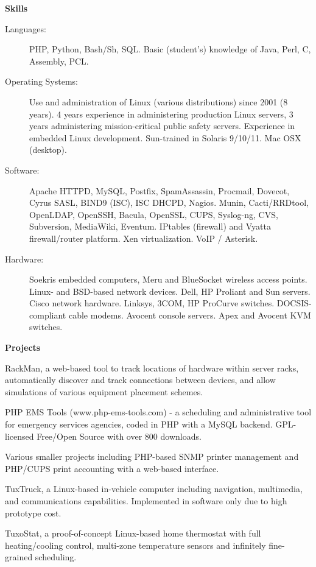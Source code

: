 \documentclass[letterpaper,11pt]{article}
\newcommand{\resheading}[1]{{\large \colorbox{mygrey}{\begin{minipage}{\textwidth}{\textbf{#1 \vphantom{p\^{E}}}}\end{minipage}}}}
\begin{document}
\resheading{Skills}

\begin{description}
\item[Languages:]
PHP, Python, Bash/Sh, SQL. Basic (student's) knowledge of Java, Perl, C, Assembly,
PCL. 
\item[Operating Systems:]
Use and administration of Linux (various distributions) since 2001 (8
years). 4 years experience in administering production Linux servers, 3 years
administering mission-critical public safety servers. Experience in embedded
Linux development. 
Sun-trained in Solaris 9/10/11. Mac OSX (desktop). 
\item[Software:]
Apache HTTPD, MySQL, Postfix, SpamAssassin, Procmail, Dovecot, Cyrus SASL, BIND9 (ISC), ISC
DHCPD, Nagios. Munin, Cacti/RRDtool, OpenLDAP, OpenSSH, Bacula,
OpenSSL, CUPS, Syslog-ng, CVS, Subversion, MediaWiki, Eventum. IPtables
(firewall) and Vyatta firewall/router platform. Xen
virtualization. VoIP / Asterisk.
\item[Hardware:]
Soekris embedded computers, Meru and BlueSocket wireless access points. Linux-
and BSD-based network devices. Dell,
HP Proliant and Sun servers. Cisco network hardware. Linksys, 3COM, HP
ProCurve switches. DOCSIS-compliant cable
modems. Avocent console servers. Apex and
Avocent KVM switches.
\end{description}

\resheading{Projects}

\begin{description}
\item[In Progress] RackMan, a web-based tool to track locations of hardware
  within server racks, automatically discover and track connections between
  devices, and allow simulations of various equipment placement schemes.
\item[2007--Present] PHP EMS Tools (www.php-ems-tools.com) - a scheduling and
  administrative tool for emergency services agencies, coded in PHP with a MySQL
  backend. GPL-licensed Free/Open Source with over 800 downloads.
\item Various smaller projects including PHP-based SNMP printer management and
PHP/CUPS print accounting with a web-based interface.
\item TuxTruck, a Linux-based in-vehicle computer including navigation,
  multimedia, and communications capabilities. Implemented in software only
  due to high prototype cost.
\item TuxoStat, a proof-of-concept Linux-based home thermostat with full
  heating/cooling control, multi-zone temperature sensors and infinitely
  fine-grained scheduling.
\end{description}
\end{document}
